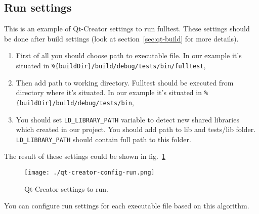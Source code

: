 \subsection{Run settings}

This is an example of Qt-Creator settings to run fulltest. These settings should be done after build settings (look at section~\ref{sec:qt-build} for more details).

\begin{enumerate}
  \item First of all you should choose path to executable file. In our example it's situated in \texttt{\%\{buildDir\}/build/debug/tests/bin/fulltest},
  \item Then add path to working directory. Fulltest should be executed from directory where it's situated. In our example it's situated in \texttt{\%\{buildDir\}/build/debug/tests/bin},
  \item You should set \texttt{LD\_LIBRARY\_PATH} variable to detect new shared libraries which created in our project. You should add path to lib and tests/lib folder. \texttt{LD\_LIBRARY\_PATH} should contain full path to this folder.
\end{enumerate}

The result of these settings could be shown in fig.~\ref{fig:qt-creator-config-run}

\begin{figure}[htb]
  \centering
  \texttt{[image: ./qt-creator-config-run.png]}
  \caption{Qt-Creator settings to run.}
  \label{fig:qt-creator-config-run}
\end{figure}

You can configure run settings for each executable file based on this algorithm.


